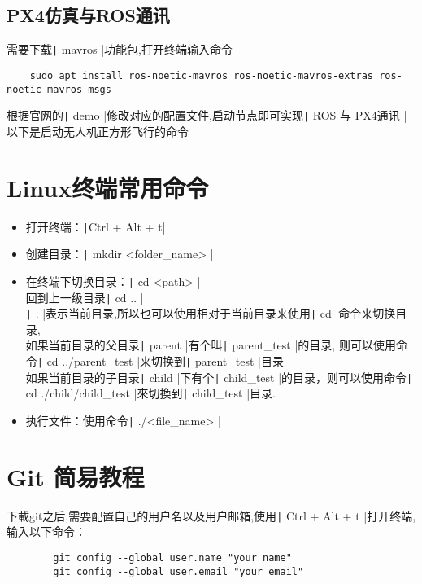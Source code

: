 \documentclass{article}
\newcommand\mintbash[1]{\texttt| #1 |}
\newcommand\bash[1]{\texttt| #1 |}
\begin{document}
\subsection{PX4仿真与ROS通讯}
需要下载\mintbash{mavros}功能包,打开终端输入命令
\begin{verbatim}
    sudo apt install ros-noetic-mavros ros-noetic-mavros-extras ros-noetic-mavros-msgs
\end{verbatim}
根据官网的\href{https://docs.px4.io/main/en/ros/mavros_offboard_cpp.html}{\bash{demo}}修改对应的配置文件,启动节点即可实现\bash{ROS 与 PX4通讯}
以下是启动无人机正方形飞行的命令
\begin{appendices}
    \section{Linux终端常用命令}
    \begin{itemize}
        \item 打开终端：\texttt|Ctrl + Alt + t|
        \item 创建目录：\bash{mkdir <folder_name>}
        \item 在终端下切换目录：\texttt| cd <path> |\\
              回到上一级目录\texttt| cd .. |\\
              \texttt| . |表示当前目录,所以也可以使用相对于当前目录来使用\texttt| cd |命令来切换目录,
              \\如果当前目录的父目录\bash{parent}有个叫\bash{parent_test}的目录,
              则可以使用命令\texttt| cd ../parent_test |来切换到\bash{parent_test}目录\\
              如果当前目录的子目录\texttt| child |下有个\bash{child_test}的目录，则可以使用命令\bash{cd ./child/child_test}來切換到\bash{child_test}目录.
              \item 执行文件：使用命令\bash{./<file_name>}
    \end{itemize}
    \section{Git 简易教程}
    下載git之后,需要配置自己的用户名以及用户邮箱,使用\texttt| Ctrl + Alt + t |打开终端,输入以下命令：
    \begin{verbatim}
        git config --global user.name "your name"
        git config --global user.email "your email"
    \end{verbatim}

\end{appendices}
\end{document}
